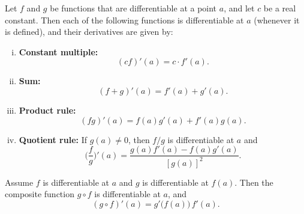 \documentclass[12pt]{article}
\newenvironment{theorembox}[1][]%
{\begin{tcolorbox}[theoremstyle,title={#1}]}%
{\end{tcolorbox}}
\begin{document}
\begin{theorembox}[Theorem 28.3 — Algebra Rules]
\label{thm:28.3}
Let $f$ and $g$ be functions that are differentiable at a point $a$, and let $c$ be a real constant.  
Then each of the following functions is differentiable at $a$ (whenever it is defined), and their derivatives
are given by:
\begin{enumerate}[(i)]
  \item \textbf{Constant multiple:}
        \[
        (cf)'(a) = c \cdot f'(a).
        \]
  \item \textbf{Sum:}
        \[
        (f+g)'(a) = f'(a) + g'(a).
        \]
  \item \textbf{Product rule:}
        \[
        (fg)'(a) = f(a)g'(a) + f'(a)g(a).
        \]
  \item \textbf{Quotient rule:} If $g(a) \neq 0$, then $f/g$ is differentiable at $a$ and
        \[
        \biggl(\frac{f}{g}\biggr)'(a)
          = \frac{g(a)f'(a) - f(a)g'(a)}{[g(a)]^{2}}.
        \]
\end{enumerate}
\end{theorembox}

\begin{theorembox}[Theorem 28.4 — Chain Rule]
\label{thm:28.4}
Assume $f$ is differentiable at $a$ and $g$ is differentiable at $f(a)$.  
Then the composite function $g \circ f$ is differentiable at $a$, and
\[
(g \circ f)'(a) = g'\bigl(f(a)\bigr)\, f'(a).
\]
\end{theorembox}
\end{document}
